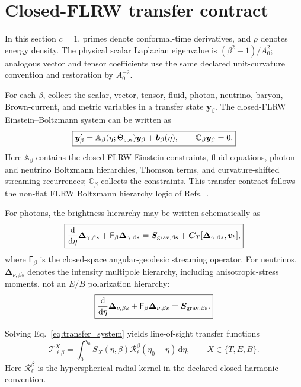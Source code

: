 \documentclass[
  aps,
  prd,
  reprint,
  superscriptaddress,
  floatfix,
  nofootinbib,
  longbibliography
]{revtex4-2}
\theoremstyle{plain}
\theoremstyle{definition}
\theoremstyle{remark}
\newcommand{\dd}{\mathrm d}
\newcommand{\Tcal}{\mathcal T}
\begin{document}
\section{Closed-FLRW transfer contract}

In this section \(c=1\), primes denote conformal-time derivatives, and \(\rho\) denotes energy density.  The physical scalar Laplacian eigenvalue is \((\beta^2-1)/A_0^2\); analogous vector and tensor coefficients use the same declared unit-curvature convention and restoration by \(A_0^{-2}\).

For each \(\beta\), collect the scalar, vector, tensor, fluid, photon, neutrino, baryon, Brown-current, and metric variables in a transfer state \(\bm y_\beta\).  The closed-FLRW Einstein--Boltzmann system can be written as
\begin{equation}
\boxed{
\bm y_\beta'=\mathbb A_\beta(\eta;\Theta_{\rm cos})\bm y_\beta+\bm b_\beta(\eta),
\qquad
\mathbb C_\beta\bm y_\beta=0.
}
\label{eq:transfer_system}
\end{equation}
Here \(\mathbb A_\beta\) contains the closed-FLRW Einstein constraints, fluid equations, photon and neutrino Boltzmann hierarchies, Thomson terms, and curvature-shifted streaming recurrences; \(\mathbb C_\beta\) collects the constraints.  This transfer contract follows the non-flat FLRW Boltzmann hierarchy logic of Refs.~\cite{TramLesgourgues2013,LesgourguesTram2014,Pitrou2020}.

For photons, the brightness hierarchy may be written schematically as
\begin{equation}
\boxed{
\frac{\dd}{\dd\eta}\bm\Delta_{\gamma,\beta s}
+\mathsf F_\beta\bm\Delta_{\gamma,\beta s}
=\bm S_{\rm grav,\beta s}+\bm C_T[\bm\Delta_{\gamma,\beta s},\bm v_b],
}
\label{eq:photon_hierarchy}
\end{equation}
where \(\mathsf F_\beta\) is the closed-space angular-geodesic streaming operator.  For neutrinos, \(\bm\Delta_{\nu,\beta s}\) denotes the intensity multipole hierarchy, including anisotropic-stress moments, not an \(E/B\) polarization hierarchy:
\begin{equation}
\boxed{
\frac{\dd}{\dd\eta}\bm\Delta_{\nu,\beta s}
+\mathsf F_\beta\bm\Delta_{\nu,\beta s}
=\bm S_{\rm grav,\beta s}.
}
\label{eq:neutrino_hierarchy}
\end{equation}

Solving Eq.~\eqref{eq:transfer_system} yields line-of-sight transfer functions
\begin{equation}
\boxed{
\Tcal_{\ell\beta}^{X}
=\int_0^{\eta_0}S_X(\eta,\beta)\mathcal R_\ell^\beta(\eta_0-\eta)\,\dd\eta,
\qquad X\in\{T,E,B\}.
}
\label{eq:los_transfer}
\end{equation}
Here \(\mathcal R_\ell^\beta\) is the hyperspherical radial kernel in the declared closed harmonic convention.
\end{document}
